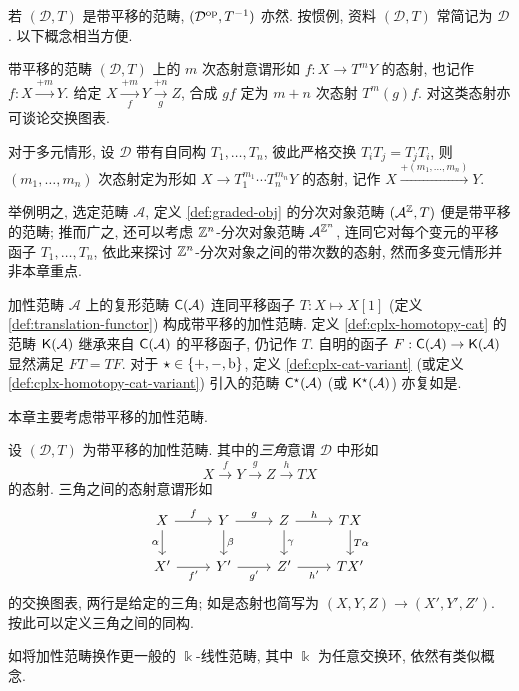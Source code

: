 若 $(\mathcal{D}, T)$ 是带平移的范畴, $(\mathcal{D}^{\operatorname{op}}, T^{-1})$ 亦然. 按惯例, 资料 $(\mathcal{D}, T)$ 常简记为 $\mathcal{D}$. 以下概念相当方便.

\begin{definition}[带次数的态射]\label{def:morphism-with-degree}
	带平移的范畴 $(\mathcal{D}, T)$ 上的 $m$ 次态射意谓形如 $f: X \to T^m Y$ 的态射, 也记作 $f: X \xrightarrow{+m} Y$. 给定 $X \xrightarrow[f]{+m} Y \xrightarrow[g]{+n} Z$, 合成 $gf$ 定为 $m+n$ 次态射 $T^m(g) f$. 对这类态射亦可谈论交换图表.
	
	对于多元情形, 设 $\mathcal{D}$ 带有自同构 $T_1, \ldots, T_n$, 彼此严格交换 $T_i T_j = T_j T_i$, 则 $(m_1, \ldots, m_n)$ 次态射定为形如 $X \to T_1^{m_1} \cdots T_n^{m_n} Y$ 的态射, 记作 $X \xrightarrow{+(m_1, \ldots, m_n)} Y$.
\end{definition}

举例明之, 选定范畴 $\mathcal{A}$, 定义 \ref{def:graded-obj} 的分次对象范畴 $(\mathcal{A}^{\mathbb{Z}}, T)$ 便是带平移的范畴; 推而广之, 还可以考虑 $\mathbb{Z}^n$-分次对象范畴 $\mathcal{A}^{\mathbb{Z}^n}$, 连同它对每个变元的平移函子 $T_1, \ldots, T_n$, 依此来探讨 $\mathbb{Z}^n$-分次对象之间的带次数的态射, 然而多变元情形并非本章重点.

\begin{example}\label{eg:cplx-as-translation-cat}
	加性范畴 $\mathcal{A}$ 上的复形范畴 $\mathsf{C}(\mathcal{A})$ 连同平移函子 $T: X \mapsto X[1]$ (定义 \ref{def:translation-functor}) 构成带平移的加性范畴. 定义 \ref{def:cplx-homotopy-cat} 的范畴 $\mathsf{K}(\mathcal{A})$ 继承来自 $\mathsf{C}(\mathcal{A})$ 的平移函子, 仍记作 $T$. 自明的函子 $F: \mathsf{C}(\mathcal{A}) \to \mathsf{K}(\mathcal{A})$ 显然满足 $FT = TF$. 对于 $\star \in \{+, -, \mathrm{b}\}$, 定义 \ref{def:cplx-cat-variant} (或定义 \ref{def:cplx-homotopy-cat-variant}) 引入的范畴 $\mathsf{C}^\star(\mathcal{A})$ (或 $\mathsf{K}^\star(\mathcal{A})$) 亦复如是.
\end{example}

本章主要考虑带平移的加性范畴.

\begin{definition}
	设 $(\mathcal{D}, T)$ 为带平移的加性范畴. 其中的\emph{三角}意谓 $\mathcal{D}$ 中形如
	\[ X \xrightarrow{f} Y \xrightarrow{g} Z \xrightarrow{h} TX \]
	的态射. 三角之间的态射意谓形如
	\[\begin{tikzcd}
		 X \arrow[r, "f"] \arrow[d, "\alpha"'] & Y \arrow[r, "g"] \arrow[d, "\beta"] & Z \arrow[r, "h"] \arrow[d, "\gamma"] & TX \arrow[d, "T\alpha"] \\
		 X' \arrow[r, "{f'}"'] & Y' \arrow[r, "{g'}"'] & Z' \arrow[r, "{h'}"'] & TX'
	\end{tikzcd}\]
	的交换图表, 两行是给定的三角; 如是态射也简写为 $(X, Y, Z) \to (X', Y', Z')$. 按此可以定义三角之间的同构.
	
	如将加性范畴换作更一般的 $\Bbbk$-线性范畴, 其中 $\Bbbk$ 为任意交换环, 依然有类似概念.
\end{definition}


